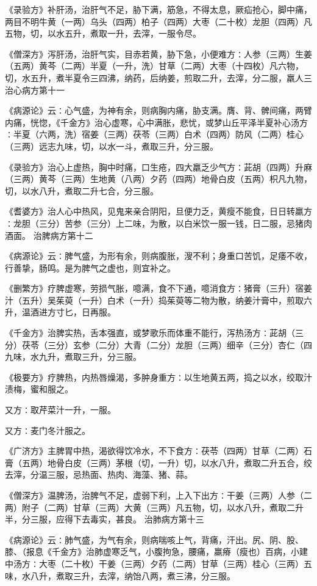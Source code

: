 \documentclass[a4paper,12pt,UTF8,twoside]{ctexbook}
\begin{document}
《录验方》补肝汤，治肝气不足，胁下满，筋急，不得太息，厥疝抢心，脚中痛，两目不明牛黄（一两）乌头（四两）柏子（四两）大枣（二十枚）龙胆（四两）凡五物，切，以水五升，煮取一升，去滓，一服令尽。

《僧深方》泻肝汤，治肝气实，目赤若黄，胁下急，小便难方∶人参（三两）生姜（五两）黄芩（二两）半夏（一升，洗）甘草（二两）大枣（十四枚）凡六物，切，水五升，煮半夏令三四沸，纳药，后纳姜，煎取二升，去滓，分二服，羸人三
治心病方第十一

《病源论》云∶心气盛，为神有余，则病胸内痛，胁支满。膺、背、髀间痛，两臂内痛，恍惚，《千金方》治心虚寒，心中满胀，悲忧，或梦山丘平泽半夏补心汤方∶半夏（六两，洗）宿姜（三两）茯苓（三两）白术（四两）防风（二两）桂心（三两）远志九味，切，以水一斗，煮取三升，分三服。

《录验方》治心上虚热，胸中时痛，口生疮，四大羸乏少气方∶茈胡（四两）升麻（三两）黄芩（三两）生地黄（八两）夕药（四两）地骨白皮（五两）枳凡九物，切，以水八升，煮取二升七合，分三服。

《耆婆方》治人心中热风，见鬼来亲合阴阳，旦便力乏，黄瘦不能食，日日转羸方∶龙胆（三分）苦参（三分）上二味，为散，以白米饮一服一钱，日二服，忌猪肉酒面。
治脾病方第十二

《病源论》云∶脾气盛，为形有余，则病腹胀，溲不利；身重口苦饥，足痿不收，行善挚，肠鸣。是为脾气之虚也，则宜补之。

《删繁方》疗脾虚寒，劳损气胀，噫满，食不下通，噫消食方∶猪膏（三升）宿姜汁（五升）吴茱萸（一升）白术（一升）捣茱萸等二物为散，纳姜汁膏中，煎取六升，温酒进方寸匕，日再服。

《千金方》治脾实热，舌本强直，或梦歌乐而体重不能行，泻热汤方∶茈胡（三分）茯苓（三分）玄参（二分）大青（二分）龙胆（三两）细辛（三分）杏仁（四九味，水九升，煮取三升，分三服。

《极要方》疗脾热，内热唇燥渴，多肿身重方∶以生地黄五两，捣之以水，绞取汁渍梅，蜜和服之。

又方∶取芹菜汁一升，一服。

又方∶麦门冬汁服之。

《广济方》主脾胃中热，渴欲得饮冷水，不下食方∶茯苓（四两）甘草（二两）石膏（五两）地骨白皮（三两）茅根（切，一升）切，以水八升，煮取二升五合，绞去滓，分温三服，忌热面、热肉、海藻、猪、蒜。

《僧深方》温脾汤，治脾气不足，虚弱下利，上入下出方∶干姜（三两）人参（二两）附子（二两）甘草（三两）大黄（三两）凡五物，切，以水八升，煮取二升半，分三服，应得下去毒实，甚良。
治肺病方第十三

《病源论》云∶肺气盛，为气有余，则病喘咳上气，背痛，汗出。尻、阴、股、膝、（报息《千金方》治肺虚寒乏气，小腹拘急，腰痛，羸瘠（瘦也）百病，小建中汤方∶大枣（二十枚）干姜（三两）夕药（二两）甘草（三两）桂心（三两）五味，水八升，煮取三升，去滓，纳饴八两，煮三沸，分三服。
\end{document}
